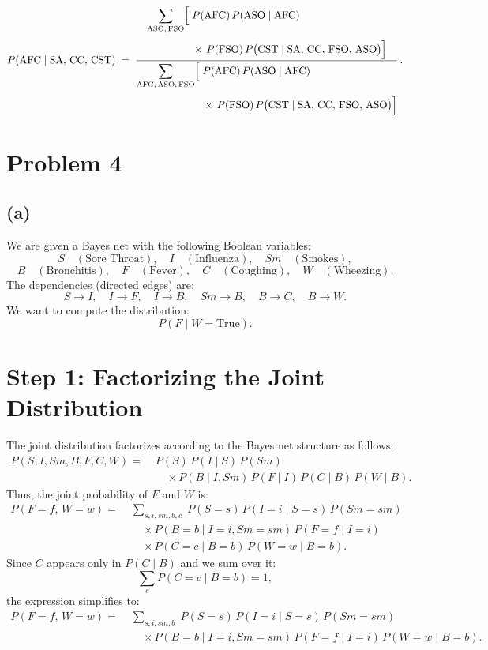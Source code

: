 \documentclass[11pt]{article}
\begin{document}
\[
P(\mathrm{AFC}\mid \mathrm{SA},\,\mathrm{CC},\,\mathrm{CST})
\;=\; \frac{
\begin{aligned}
\sum_{\mathrm{ASO},\,\mathrm{FSO}} \Bigl[ 
&\; P(\mathrm{AFC})\, P(\mathrm{ASO}\mid \mathrm{AFC})\\[1mm]
&\; \times \, P(\mathrm{FSO})\, P\bigl(\mathrm{CST}\mid \mathrm{SA},\,\mathrm{CC},\,\mathrm{FSO},\,\mathrm{ASO}\bigr)
\Bigr]
\end{aligned}
}{
\begin{aligned}
\sum_{\mathrm{AFC},\,\mathrm{ASO},\,\mathrm{FSO}} \Bigl[
&\; P(\mathrm{AFC})\, P(\mathrm{ASO}\mid \mathrm{AFC})\\[1mm]
&\; \times \, P(\mathrm{FSO})\, P\bigl(\mathrm{CST}\mid \mathrm{SA},\,\mathrm{CC},\,\mathrm{FSO},\,\mathrm{ASO}\bigr)
\Bigr]
\end{aligned}
}\,.
\]



\newpage

\section*{Problem 4}
\subsection*{(a)}
We are given a Bayes net with the following Boolean variables:
\[
S \quad (\text{Sore Throat}), \quad I \quad (\text{Influenza}), \quad Sm \quad (\text{Smokes}),
\]
\[
B \quad (\text{Bronchitis}), \quad F \quad (\text{Fever}), \quad C \quad (\text{Coughing}), \quad W \quad (\text{Wheezing}).
\]
The dependencies (directed edges) are:
\[
S \to I,\quad I \to F,\quad I \to B,\quad Sm \to B,\quad B \to C,\quad B \to W.
\]
We want to compute the distribution:
\[
P(F \mid W = \text{True}).
\]

\section*{Step 1: Factorizing the Joint Distribution}
The joint distribution factorizes according to the Bayes net structure as follows:
\begin{align*}
P(S, I, Sm, B, F, C, W) =\; & P(S)\,P(I \mid S)\,P(Sm) \\
 & \quad \times P(B \mid I, Sm)\,P(F \mid I)\,P(C \mid B)\,P(W \mid B).
\end{align*}
Thus, the joint probability of \(F\) and \(W\) is:
\begin{align*}
P(F=f,\,W=w) =\; & \sum_{s,i,sm,b,c} \; P(S=s)\,P(I=i \mid S=s)\,P(Sm=sm)\\[1mm]
 & \quad \times P(B=b \mid I=i,Sm=sm)\,P(F=f \mid I=i)\\[1mm]
 & \quad \times P(C=c \mid B=b)\,P(W=w \mid B=b).
\end{align*}
Since \(C\) appears only in \(P(C \mid B)\) and we sum over it:
\[
\sum_{c} P(C=c \mid B=b)=1,
\]
the expression simplifies to:
\begin{align*}
P(F=f,\,W=w) =\; & \sum_{s,i,sm,b} \; P(S=s)\,P(I=i \mid S=s)\,P(Sm=sm)\\[1mm]
 & \quad \times P(B=b \mid I=i,Sm=sm)\,P(F=f \mid I=i)\,P(W=w \mid B=b).
\end{align*}
\end{document}
